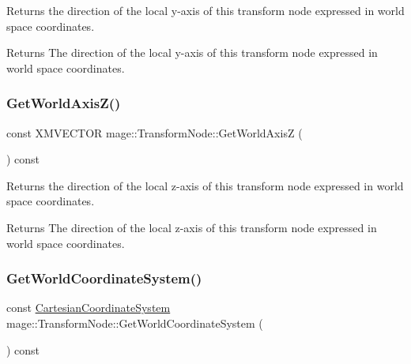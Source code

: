 Returns the direction of the local y-\/axis of this transform node expressed in world space coordinates.

\begin{DoxyReturn}{Returns}
The direction of the local y-\/axis of this transform node expressed in world space coordinates. 
\end{DoxyReturn}
\hypertarget{structmage_1_1_transform_node_a1e404dbe189d7fd326c4816d987759b6}{}\label{structmage_1_1_transform_node_a1e404dbe189d7fd326c4816d987759b6} 
\subsubsection{\texorpdfstring{Get\+World\+Axis\+Z()}{GetWorldAxisZ()}}
{\footnotesize\ttfamily const X\+M\+V\+E\+C\+T\+OR mage\+::\+Transform\+Node\+::\+Get\+World\+AxisZ (\begin{DoxyParamCaption}{ }\end{DoxyParamCaption}) const\hspace{0.3cm}{\ttfamily [noexcept]}}

Returns the direction of the local z-\/axis of this transform node expressed in world space coordinates.

\begin{DoxyReturn}{Returns}
The direction of the local z-\/axis of this transform node expressed in world space coordinates. 
\end{DoxyReturn}
\hypertarget{structmage_1_1_transform_node_a511e55c63c15d9e8958f33b298b6c103}{}\label{structmage_1_1_transform_node_a511e55c63c15d9e8958f33b298b6c103} 
\subsubsection{\texorpdfstring{Get\+World\+Coordinate\+System()}{GetWorldCoordinateSystem()}}
{\footnotesize\ttfamily const \hyperlink{structmage_1_1_cartesian_coordinate_system}{Cartesian\+Coordinate\+System} mage\+::\+Transform\+Node\+::\+Get\+World\+Coordinate\+System (\begin{DoxyParamCaption}{ }\end{DoxyParamCaption}) const\hspace{0.3cm}{\ttfamily [noexcept]}}

